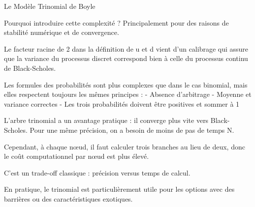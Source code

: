\documentclass[aspectratio=169, 10pt]{beamer}
\begin{document}
\begin{frame}{Le Modèle Trinomial de Boyle}
{        Pourquoi introduire cette complexité ?
        Principalement pour des raisons de stabilité numérique et de convergence.
        
        Le facteur racine de 2 dans la définition de u et d vient d'un calibrage
        qui assure que la variance du processus discret correspond bien
        à celle du processus continu de Black-Scholes.
        
        Les formules des probabilités sont plus complexes que dans le cas binomial,
        mais elles respectent toujours les mêmes principes :
        - Absence d'arbitrage
        - Moyenne et variance correctes
        - Les trois probabilités doivent être positives et sommer à 1
        
        L'arbre trinomial a un avantage pratique : il converge plus vite vers Black-Scholes.
        Pour une même précision, on a besoin de moins de pas de temps N.
        
        Cependant, à chaque nœud, il faut calculer trois branches au lieu de deux,
        donc le coût computationnel par nœud est plus élevé.
        
        C'est un trade-off classique : précision versus temps de calcul.
        
        En pratique, le trinomial est particulièrement utile pour les options
        avec des barrières ou des caractéristiques exotiques.
    }
\end{frame}
\end{document}
